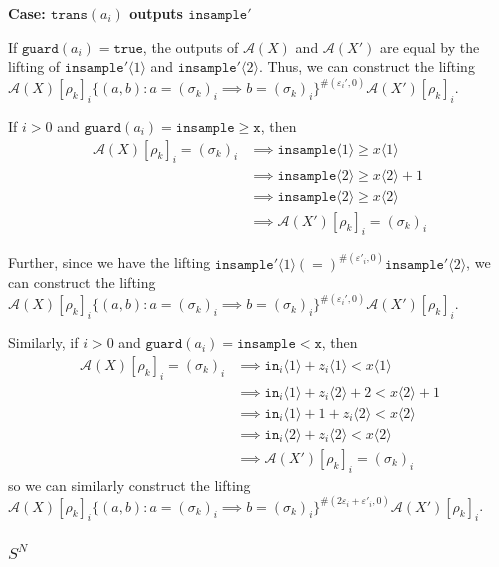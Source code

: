 \documentclass[12pt]{article}
\newcommand{\gguard}[1][x]{\texttt{insample}\geq \texttt{#1}}
\newcommand{\lguard}[1][x]{\texttt{insample} < \texttt{#1}}
\newcommand{\brangle}[1]{\langle #1 \rangle}
\newcommand{\guard}{\texttt{guard}}
\newcommand{\trans}{\texttt{trans}}
\theoremstyle{definition}
\begin{document}
\textbf{Case: $\trans(a_i)$ outputs $\texttt{insample}'$}

If $\guard(a_i) = \texttt{true}$, the outputs of $\mathcal{A}(X)$ and $\mathcal{A}(X')$ are equal by the lifting of $\texttt{insample}'\brangle{1}$ and $\texttt{insample}'\brangle{2}$. Thus, we can construct the lifting  $\mathcal{A}(X)[\rho_k]_i\{(a, b): a = (\sigma_k)_i \implies b = (\sigma_k)_i\}^{\#(\varepsilon_i', 0)}\mathcal{A}(X')[\rho_k]_i$.

If $i > 0$ and $\guard(a_i) = \gguard$, then \begin{align*}
	\mathcal{A}(X)[\rho_k]_i = (\sigma_k)_i&\implies \texttt{insample}\brangle{1} \geq x\brangle{1}\\
	&\implies \texttt{insample}\brangle{2} \geq x\brangle{2}+1\\
	&\implies \texttt{insample}\brangle{2} \geq x\brangle{2}\\
	&\implies \mathcal{A}(X')[\rho_k]_i = (\sigma_k)_i
\end{align*}

Further, since we have the lifting $\texttt{insample}'\brangle{1} (=)^{\#(\varepsilon'_i, 0)} \texttt{insample}'\brangle{2}$, we can construct the lifting $\mathcal{A}(X)[\rho_k]_i\{(a, b): a = (\sigma_k)_i \implies b = (\sigma_k)_i\}^{\#(\varepsilon_i', 0)}\mathcal{A}(X')[\rho_k]_i$.

Similarly, if $i>0$ and $\guard(a_i) = \lguard$, then \begin{align*}
	\mathcal{A}(X)[\rho_k]_i = (\sigma_k)_i&\implies \texttt{in}_i\brangle{1} + z_i\brangle{1} < x\brangle{1}\\
	&\implies \texttt{in}_i\brangle{1} + z_i\langle 2 \rangle +2 < x\langle 2 \rangle+1\\
	&\implies\texttt{in}_i\brangle{1} +1 + z_i\langle 2 \rangle < x\langle 2 \rangle\\
	&\implies\texttt{in}_i\langle 2 \rangle + z_i\langle 2 \rangle < x\langle 2 \rangle\\
	&\implies \mathcal{A}(X')[\rho_k]_i = (\sigma_k)_i
\end{align*}
so we can similarly construct the lifting $\mathcal{A}(X)[\rho_k]_i\{(a, b): a = (\sigma_k)_i \implies b = (\sigma_k)_i\}^{\#(2\varepsilon_i+\varepsilon'_i, 0)}\mathcal{A}(X')[\rho_k]_i$.

\subsubsection{$S^N$}
\end{document}
